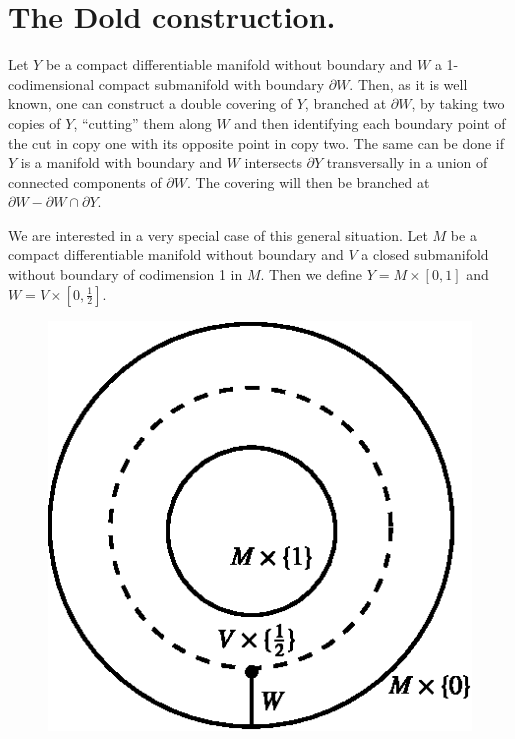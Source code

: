 \section{The Dold construction.}\label{art11-sec2}\pageoriginale

Let $Y$ be a compact differentiable manifold without boundary and $W$ a 1-codimensional compact submanifold with boundary $\partial W$. Then, as it is well known, one can construct a double covering of $Y$, branched at $\partial W$, by taking two copies of $Y$, ``cutting'' them along $W$ and then identifying each boundary point of the cut in copy one with its opposite point in copy two. The same can be done if $Y$ is a manifold with boundary and $W$ intersects $\partial Y$ transversally in a union of connected components of $\partial W$. The covering will then be branched at $\partial W-\partial W\cap \partial Y$.

We are interested in a very special case of this general situation. Let $M$ be a compact differentiable manifold without boundary and $V$ a closed submanifold without boundary of codimension 1 in $M$. Then we define $Y=M\times [0,1]$ and $W=V\times [0,\frac{1}{2}]$.
\begin{figure}[H]
\centering
\includegraphics{src/chap11/fig1.eps}
\end{figure}

